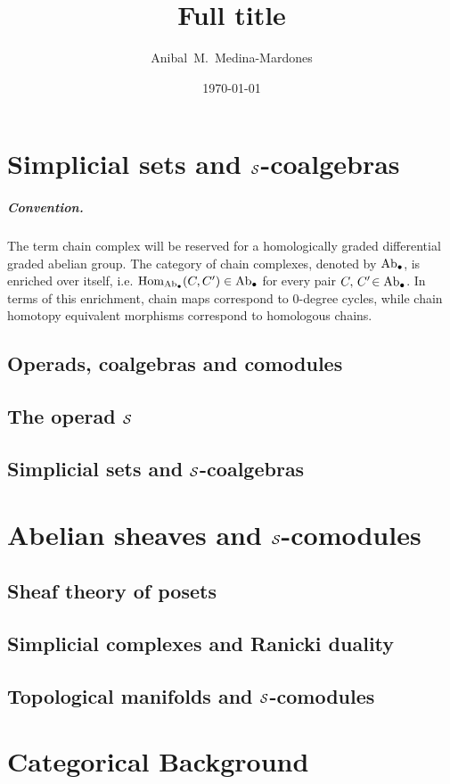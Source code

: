 \documentclass{amsbook}
\title[Short title]{Full title}
\author[A.~Medina-Mardones]{Anibal~M.~Medina-Mardones}
\date{\today}
\begin{document}
	
	\chapter{Simplicial sets and $\S$-coalgebras}

	\paragraph{Convention.}\hspace*{-8pt}The term chain complex will be reserved for a homologically graded differential graded abelian group. The category of chain complexes, denoted by $\Ab_\bullet$, is enriched over itself, i.e. $\Hom_{\Ab_\bullet}(C,C')\in\Ab_\bullet$ for every pair $C,\,C'\!\in\Ab_\bullet$. In terms of this enrichment, chain maps correspond to $0$-degree cycles, while chain homotopy equivalent morphisms correspond to homologous chains.

	\section{Operads, coalgebras and comodules}
	

	\section{The operad $\S$}
	

	\section{Simplicial sets and $\S$-coalgebras}
	

	\chapter{Abelian sheaves and $\S$-comodules}

	\section{Sheaf theory of posets}
	

	\section{Simplicial complexes and Ranicki duality}
	

	\section{Topological manifolds and $\S$-comodules}
	

	\appendix
	\chapter{Categorical Background}
	

	\sloppy
	\printbibliography
\end{document}
